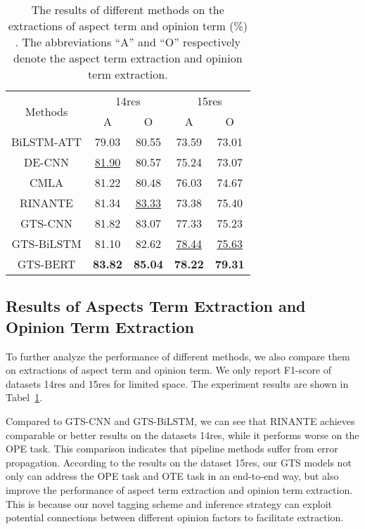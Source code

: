 \documentclass[11pt,a4paper]{article}
\begin{document}
\begin{table}[!htbp]
	\centering
	\resizebox{0.9\linewidth}{!}
	{
		
		\begin{tabular}{c|c c|c c}
			\hline
			\multirow{2}{*}{Methods} & \multicolumn{2}{c|}{14res} & \multicolumn{2}{c}{15res} \\ 
			\cline{2-5}
			&A& O &A& O \\
			
			\hline
			BiLSTM-ATT & 79.03 & 80.55 & 73.59 & 73.01 \\
			DE-CNN & \underline{81.90} & 80.57  & 75.24 & 73.07 \\
			CMLA & 81.22 & 80.48 & 76.03 & 74.67  \\
			RINANTE & 81.34 & \underline{83.33} & 73.38 & 75.40  \\
			\hline
			GTS-CNN & 81.82 & 83.07 & 77.33 & 75.23 \\
			GTS-BiLSTM & 81.10 & 82.62 &  \underline{78.44} & \underline{75.63} \\
			GTS-BERT & \textbf{83.82} & \textbf{85.04} &  \textbf{78.22} & \textbf{79.31}  \\
			\hline
		\end{tabular} 
	}
	\caption{The results of different methods on the extractions of aspect term and opinion term (\%) . The abbreviations ``A'' and ``O'' respectively denote the aspect term extraction and opinion term extraction.} 
	\label{aspectopinionextraction}
\end{table}


\subsection{Results of Aspects Term Extraction and Opinion Term Extraction}
To further analyze the performance of different methods, we also compare them on extractions of aspect term and opinion term. We only report F1-score of datasets 14res and 15res for limited space. The experiment results are shown in Tabel~\ref{aspectopinionextraction}.

Compared to GTS-CNN and GTS-BiLSTM, we can see that RINANTE achieves comparable or better results on the datasets 14res, while it performs worse on the OPE task. This comparison indicates that pipeline methods suffer from error propagation. According to the results on the dataset 15res, our GTS models not only can address the OPE task and OTE task in an end-to-end way, but also improve the performance of aspect term extraction and opinion term extraction. This is because our novel tagging scheme and inference strategy can exploit potential connections between different opinion factors to facilitate extraction.
\end{document}

